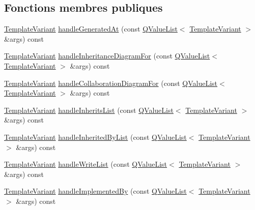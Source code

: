 \subsection*{Fonctions membres publiques}
\begin{DoxyCompactItemize}
\item 
\hyperlink{class_template_variant}{Template\+Variant} \hyperlink{class_translate_context_1_1_private_aad0bd246ae47862595e42b977040ed03}{handle\+Generated\+At} (const \hyperlink{class_q_value_list}{Q\+Value\+List}$<$ \hyperlink{class_template_variant}{Template\+Variant} $>$ \&args) const 
\item 
\hyperlink{class_template_variant}{Template\+Variant} \hyperlink{class_translate_context_1_1_private_a51fdae93a9aa5cfcdf67b15ff1d7ec0e}{handle\+Inheritance\+Diagram\+For} (const \hyperlink{class_q_value_list}{Q\+Value\+List}$<$ \hyperlink{class_template_variant}{Template\+Variant} $>$ \&args) const 
\item 
\hyperlink{class_template_variant}{Template\+Variant} \hyperlink{class_translate_context_1_1_private_a17b3abb0be23fd71938c9203cf97f833}{handle\+Collaboration\+Diagram\+For} (const \hyperlink{class_q_value_list}{Q\+Value\+List}$<$ \hyperlink{class_template_variant}{Template\+Variant} $>$ \&args) const 
\item 
\hyperlink{class_template_variant}{Template\+Variant} \hyperlink{class_translate_context_1_1_private_af0125acd3aac7adb5c2db617213abfc0}{handle\+Inherits\+List} (const \hyperlink{class_q_value_list}{Q\+Value\+List}$<$ \hyperlink{class_template_variant}{Template\+Variant} $>$ \&args) const 
\item 
\hyperlink{class_template_variant}{Template\+Variant} \hyperlink{class_translate_context_1_1_private_ad6212e8a60960d26a83203045cd81c75}{handle\+Inherited\+By\+List} (const \hyperlink{class_q_value_list}{Q\+Value\+List}$<$ \hyperlink{class_template_variant}{Template\+Variant} $>$ \&args) const 
\item 
\hyperlink{class_template_variant}{Template\+Variant} \hyperlink{class_translate_context_1_1_private_ade49acf8abf17d3cd46fadd1aafaafb6}{handle\+Write\+List} (const \hyperlink{class_q_value_list}{Q\+Value\+List}$<$ \hyperlink{class_template_variant}{Template\+Variant} $>$ \&args) const 
\item 
\hyperlink{class_template_variant}{Template\+Variant} \hyperlink{class_translate_context_1_1_private_a04a10550f65096a842aa627513f6ee3c}{handle\+Implemented\+By} (const \hyperlink{class_q_value_list}{Q\+Value\+List}$<$ \hyperlink{class_template_variant}{Template\+Variant} $>$ \&args) const 

\end{DoxyCompactItemize}
